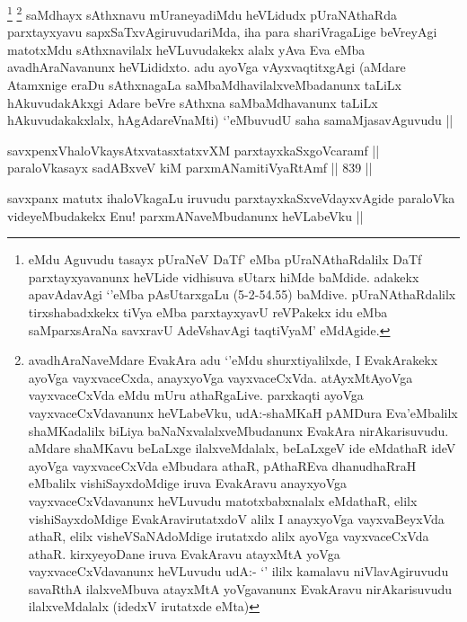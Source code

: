 \begin{artha}
\footnote{\stext eMdu Aguvudu tasayx pUraNeV DaTf' eMba pUraNAthaRdalilx DaTf parxtayxyavanunx heVLide vidhisuva sUtarx hiMde baMdide. adakekx apavAdavAgi `\stext'eMba pAsUtarxgaLu (5-2-54.55) baMdive. pUraNAthaRdalilx tirxshabadxkekx tiVya eMba parxtayxyavU reVPakekx idu eMba saMparxsAraNa savxravU AdeVshavAgi taqtiVyaM' eMdAgide.}
\footnote{avadhAraNaveMdare EvakAra adu `\stext'eMdu shurxtiyalilxde, I EvakArakekx ayoVga vayxvaceCxda, anayxyoVga vayxvaceCxVda. atAyxMtAyoVga vayxvaceCxVda eMdu mUru athaRgaLive. parxkaqti ayoVga vayxvaceCxVdavanunx heVLabeVku, udA:-shaMKaH pAMDura Eva'eMbalilx shaMKadalilx biLiya baNaNxvalalxveMbudanunx EvakAra nirAkarisuvudu. aMdare shaMKavu beLaLxge ilalxveMdalalx, beLaLxgeV ide eMdathaR ideV ayoVga vayxvaceCxVda eMbudara athaR, pAthaREva dhanudhaRraH eMbalilx vishiSayxdoMdige iruva EvakAravu anayxyoVga vayxvaceCxVdavanunx heVLuvudu matotxbabxnalalx eMdathaR, elilx vishiSayxdoMdige EvakAravirutatxdoV alilx I anayxyoVga vayxvaBeyxVda athaR, elilx visheVSaNAdoMdige irutatxdo alilx ayoVga vayxvaceCxVda athaR. kirxyeyoDane iruva EvakAravu atayxMtA yoVga vayxvaceCxVdavanunx heVLuvudu udA:- `\stext' ililx kamalavu niVlavAgiruvudu savaRthA ilalxveMbuva atayxMtA yoVgavanunx EvakAravu nirAkarisuvudu ilalxveMdalalx (idedxV irutatxde eMta)}
saMdhayx sAthxnavu mUraneyadiMdu heVLidudx pUraNAthaRda parxtayxyavu sapxSaTxvAgiruvudariMda, iha para shariVragaLige beVreyAgi matotxMdu sAthxnavilalx heVLuvudakekx alalx yAva Eva eMba avadhAraNavanunx heVLididxto. adu ayoVga vAyxvaqtitxgAgi (aMdare Atamxnige eraDu sAthxnagaLa saMbaMdhavilalxveMbadanunx taLiLx hAkuvudakAkxgi Adare beVre sAthxna saMbaMdhavanunx taLiLx hAkuvudakakxlalx, hAgAdareVnaMti) `\stext'eMbuvudU saha samaMjasavAguvudu ||
\end{artha}

\begin{shl}
savxpenxVhaloVkaysAtxvatasxtatxvXM parxtayxkaSxgoVcaramf || \\
paraloVkasayx sadABxveV kiM parxmANamitiVyaRtAmf ||  839 ||  
\end{shl}

\begin{artha}
savxpanx matutx ihaloVkagaLu iruvudu parxtayxkaSxveVdayxvAgide paraloVka videyeMbudakekx Enu! parxmANaveMbudanunx heVLabeVku ||
\end{artha}



